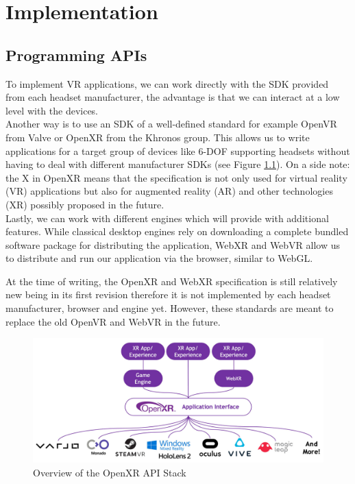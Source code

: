 \chapter{Implementation}
\label{chap:Impl}
\section{Programming APIs}

To implement VR applications, we can work directly with the SDK provided from each headset manufacturer, the advantage is that we can interact at a low level with the devices.\\ 
Another way is to use an SDK of a well-defined standard for example OpenVR from Valve or OpenXR from the Khronos group. This allows us to write applications for a target group of devices like 6-DOF supporting headsets without having to deal with different manufacturer SDKs (see Figure \ref{fig:openxr-overview}). On a side note: the X in OpenXR means that the specification is not only used for virtual reality (VR) applications but also for augmented reality (AR) and other technologies (XR) possibly proposed in the future.\\
Lastly, we can work with different engines which will provide with additional features. While classical desktop engines rely on downloading a complete bundled software package for distributing the application, WebXR and WebVR allow us to distribute and run our application via the browser, similar to WebGL.

At the time of writing, the OpenXR and WebXR specification is still relatively new being in its first revision therefore it is not implemented by each headset manufacturer, browser and engine yet. However, these standards are meant to replace the old OpenVR and WebVR in the future.

\begin{figure}[!hbt]
    \centering
    \includegraphics[width=\textwidth]{graphics/openXR-overview.jpg}
    \caption{Overview of the OpenXR API Stack \cite{khronosGroupOpenXR}}
    \label{fig:openxr-overview}
\end{figure}


